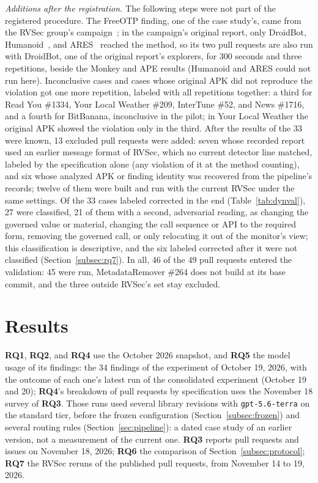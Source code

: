 \documentclass[conference]{IEEEtran}
\newcommand{\researchq}[1]{\textbf{RQ#1}}
\begin{document}
\emph{Additions after the registration.} The following steps were not part of
the registered procedure. The FreeOTP finding, one of the case study's, came from
the RVSec group's campaign~\cite{costa2026effectiveness}; in the campaign's
original report, only DroidBot, Humanoid~\cite{li2019humanoid}, and
ARES~\cite{romdhana2022ares} reached the method, so its two pull requests are
also run with DroidBot, one of the original report's explorers, for 300
seconds and three repetitions, beside the Monkey and APE results (Humanoid and
ARES could not run here). Inconclusive cases and cases whose original APK did
not reproduce the violation got one more repetition, labeled with all
repetitions together: a third for Read You \#1334, Your Local Weather \#209,
InterTune \#52, and News \#1716, and a fourth for BitBanana, inconclusive in
the pilot; in Your Local Weather the original APK showed the violation only in
the third. After the results of the 33 were known, 13 excluded pull requests
were added: seven whose recorded report used an earlier message format of
RVSec, which no current detector line matched, labeled by the specification
alone (any violation of it at the method counting), and six whose analyzed APK
or finding identity was recovered from the pipeline's records; twelve of them
were built and run with the current RVSec under the same settings. Of the 33 cases
labeled corrected in the end (Table~\ref{tab:dynval}), 27 were classified, 21
of them with a second, adversarial reading, as changing the
governed value or material, changing the call sequence or API to the required
form, removing the governed call, or only relocating it out of the monitor's
view; this classification is descriptive, and the six labeled corrected after
it were not classified (Section~\ref{subsec:rq7}). In all, 46 of the 49 pull requests
entered the validation: 45 were run, MetadataRemover \#264 does not build at
its base commit, and the three outside RVSec's set stay excluded.

\section{Results}
\label{sec:results}

\researchq{1}, \researchq{2}, and \researchq{4} use the October 2026
snapshot, and \researchq{5} the model usage of its findings: the 34 findings
of the experiment of October 19, 2026, with the outcome of each one's latest
run of the consolidated experiment (October 19 and 20); \researchq{4}'s
breakdown of pull requests by specification uses the November 18 survey of
\researchq{3}. Those runs used several
library revisions with \texttt{gpt-5.6-terra} on the standard tier, before the
frozen configuration (Section~\ref{subsec:frozen}) and several routing rules
(Section~\ref{sec:pipeline}): a dated case study of an earlier version, not a
measurement of the current one. \researchq{3} reports pull requests and issues
on November 18, 2026; \researchq{6} the comparison of
Section~\ref{subsec:protocol}; \researchq{7} the RVSec reruns of the published
pull requests, from November 14 to 19, 2026.
\end{document}
